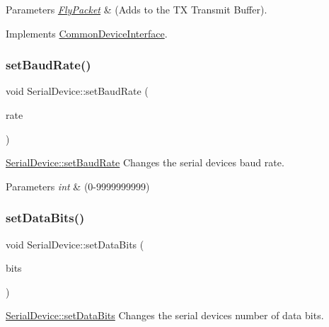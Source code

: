 \begin{DoxyParams}{Parameters}
{\em \hyperlink{class_fly_packet}{Fly\+Packet}} & (Adds to the TX Transmit Buffer). \\
\hline
\end{DoxyParams}


Implements \hyperlink{class_common_device_interface}{Common\+Device\+Interface}.

\hypertarget{class_serial_device_af06c6a34b54819e71186243a38606280}{}\label{class_serial_device_af06c6a34b54819e71186243a38606280} 
\subsubsection{\texorpdfstring{set\+Baud\+Rate()}{setBaudRate()}}
{\footnotesize\ttfamily void Serial\+Device\+::set\+Baud\+Rate (\begin{DoxyParamCaption}\item[{int}]{rate }\end{DoxyParamCaption})}



\hyperlink{class_serial_device_af06c6a34b54819e71186243a38606280}{Serial\+Device\+::set\+Baud\+Rate} Changes the serial device\textquotesingle{}s baud rate. 


\begin{DoxyParams}{Parameters}
{\em int} & (0-\/9999999999) \\
\hline
\end{DoxyParams}
\hypertarget{class_serial_device_ad0ddca3e77e1d1d4df7c68e83f1ecd91}{}\label{class_serial_device_ad0ddca3e77e1d1d4df7c68e83f1ecd91} 
\subsubsection{\texorpdfstring{set\+Data\+Bits()}{setDataBits()}}
{\footnotesize\ttfamily void Serial\+Device\+::set\+Data\+Bits (\begin{DoxyParamCaption}\item[{int}]{bits }\end{DoxyParamCaption})}



\hyperlink{class_serial_device_ad0ddca3e77e1d1d4df7c68e83f1ecd91}{Serial\+Device\+::set\+Data\+Bits} Changes the serial device\textquotesingle{}s number of data bits. 


